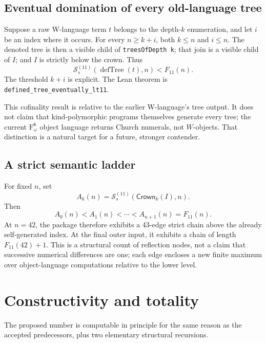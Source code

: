 \documentclass[11pt]{article}
\theoremstyle{definition}
\theoremstyle{remark}
\newcommand{\Fk}{\mathrm{F}_{\omega}^{\mathsf{k}}}
\newcommand{\code}[1]{\texttt{#1}}
\newcommand{\Sstage}{\mathcal{S}^{(11)}}
\newcommand{\Crown}{\mathsf{Crown}}
\newcommand{\Feleven}{F_{11}}
\begin{document}
\subsection{Eventual domination of every old-language tree}

Suppose a raw W-language term $t$ belongs to the depth-$k$ enumeration, and let
$i$ be an index where it occurs.  For every
$n\ge k+i$, both $k\le n$ and $i\le n$.  The denoted tree is then a visible
child of \code{treesOfDepth k}; that join is a visible child of $I$; and $I$ is
strictly below the crown.  Thus
\[
  \Sstage_s(\operatorname{defTree}(t),n)<\Feleven(n).
\]
The threshold $k+i$ is explicit.  The Lean theorem is
\code{defined\_tree\_eventually\_lt11}.

This cofinality result is relative to the earlier W-language's tree output.  It
does not claim that kind-polymorphic programs themselves generate every tree;
the current $\Fk$ object language returns Church numerals, not $W$-objects.
That distinction is a natural target for a future, stronger contender.

\subsection{A strict semantic ladder}

For fixed $n$, set
\[
  A_k(n)=\Sstage_s(\Crown_k(I),n).
\]
Then
\[
  A_0(n)<A_1(n)<\cdots<A_{n+1}(n)=\Feleven(n).
\]
At $n=42$, the package therefore exhibits a 43-edge strict chain above the
already self-generated index.  At the final outer input, it exhibits a chain
of length $\Feleven(42)+1$.  This is a structural count of reflection nodes,
not a claim that successive numerical differences are one; each edge encloses
a new finite maximum over object-language computations relative to the lower
level.

\section{Constructivity and totality}

The proposed number is computable in principle for the same reason as the
accepted predecessors, plus two elementary structural recursions.
\end{document}
